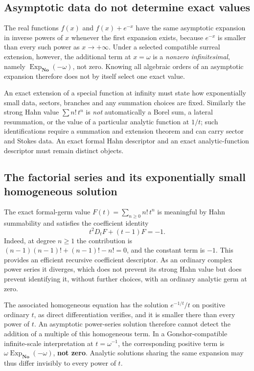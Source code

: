 \documentclass[11pt,letterpaper]{article}
\numberwithin{equation}{section}
\theoremstyle{definition}
\theoremstyle{remark}
\newcommand{\No}{\mathbf{No}}
\newcommand{\ExpNo}{\operatorname{Exp}_{\No}}
\begin{document}
\subsection{Asymptotic data do not determine exact values}
\label{cas:sub-asymptotic}
The real functions $f(x)$ and $f(x)+e^{-x}$ have the same asymptotic expansion
in inverse powers of $x$ whenever the first expansion exists, because $e^{-x}$
is smaller than every such power as $x\to+\infty$. Under a selected compatible
surreal extension, however, the additional term at $x=\omega$ is a \emph{nonzero
infinitesimal}, namely $\ExpNo(-\omega)$, not zero. Knowing all algebraic orders
of an asymptotic expansion therefore does not by itself select one exact value.

An exact extension of a special function at infinity must state how
exponentially small data, sectors, branches and any summation choices are fixed.
Similarly the strong Hahn value $\sum n!\,t^n$ is \emph{not} automatically a
Borel sum, a lateral resummation, or the value of a particular analytic function
at $1/t$; such identifications require a summation and extension theorem and can
carry sector and Stokes data. An exact formal Hahn descriptor and an exact
analytic-function descriptor must remain distinct objects.

\subsection{The factorial series and its exponentially small homogeneous solution}
\label{cas:sub-factorial}
The exact formal-germ value $F(t)=\sum_{n\ge0}n!\,t^n$ is meaningful by Hahn
summability and satisfies the coefficient identity
\begin{equation}\label{cas:eq-factorialode}
 t^2D_tF+(t-1)F=-1 .
\end{equation}
Indeed, at degree $n\ge1$ the contribution is $(n-1)(n-1)!+(n-1)!-n!=0$, and the
constant term is $-1$. This provides an efficient recursive coefficient
descriptor. As an ordinary complex power series it diverges, which does not
prevent its strong Hahn value but does prevent identifying it, without further
choices, with an ordinary analytic germ at zero.

The associated homogeneous equation has the solution $e^{-1/t}/t$ on positive
ordinary $t$, as direct differentiation verifies, and it is smaller there than
every power of $t$. An asymptotic power-series solution therefore cannot detect
the addition of a multiple of this homogeneous term. In a Gonshor-compatible
infinite-scale interpretation at $t=\omega^{-1}$, the corresponding positive
term is $\omega\ExpNo(-\omega)$, \textbf{not zero}. Analytic solutions sharing
the same expansion may thus differ invisibly to every power of $t$.
\end{document}
